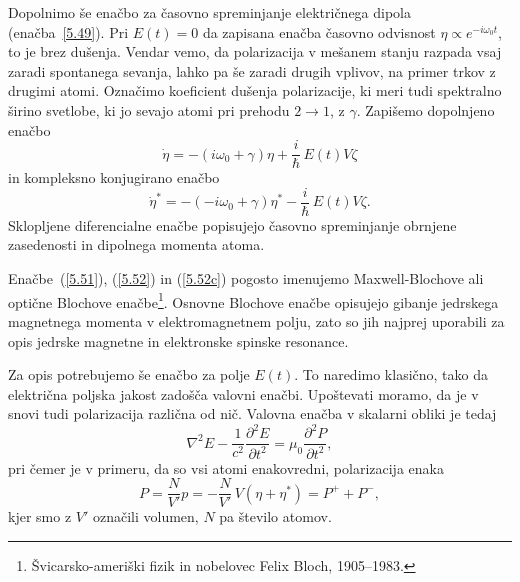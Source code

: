 Dopolnimo še enačbo za časovno spreminjanje električnega dipola 
(enačba~\ref{5.49}). Pri $E(t)=0$ da zapisana enačba časovno odvisnost 
$\eta \propto e^{-i \omega_0 t}$, to je brez dušenja. Vendar vemo, da
polarizacija v mešanem stanju razpada vsaj zaradi spontanega sevanja, lahko
pa še zaradi drugih vplivov, na primer trkov z drugimi atomi. Označimo
koeficient dušenja polarizacije, ki meri tudi spektralno širino svetlobe, 
ki jo sevajo atomi pri prehodu $2\rightarrow 1$, z $\gamma$. Zapišemo
dopolnjeno enačbo
\begin{equation}  
\label{5.52}
\dot{\eta}=- \left(i \omega_0+\gamma\right)\eta+\frac{i}{\hbar}\,E(t)V \zeta
\end{equation}
in kompleksno konjugirano enačbo
\begin{equation}  
\label{5.52c}
\dot{\eta}^*=-\left(-i \omega_0+\gamma\right)\eta^*-\frac{i}{\hbar}\,E(t)V \zeta.
\end{equation}
Sklopljene diferencialne enačbe popisujejo časovno
spreminjanje obrnjene zasedenosti in dipolnega momenta atoma. 
\begin{remark}
 Enačbe~(\ref{5.51}), (\ref{5.52}) in (\ref{5.52c}) pogosto imenujemo 
 Maxwell-Blochove ali optične Blochove enačbe\footnote{Švicarsko-ameriški fizik 
 in nobelovec Felix Bloch, 1905--1983.}. Osnovne Blochove enačbe opisujejo gibanje 
 jedrskega magnetnega  momenta v elektromagnetnem polju, zato so jih najprej uporabili za opis 
 jedrske magnetne in elektronske spinske resonance. 
\end{remark}

Za opis potrebujemo še enačbo za polje $E(t)$. To naredimo klasično, tako da
električna poljska jakost zadošča valovni enačbi. Upoštevati moramo, 
da je v snovi tudi polarizacija različna od nič. 
Valovna enačba v skalarni obliki je tedaj
\begin{equation}  
\label{5.54}
\nabla^2 E-\frac{1}{c^2}\frac{\partial^2 E}{\partial t^2}=\mu_0 \frac{\partial^2 P}{\partial t^2},
\end{equation}
pri čemer je v primeru, da so vsi atomi enakovredni, polarizacija enaka
\begin{equation}  
\label{5.53}
P=\frac{N}{V'}p = -\frac{N}{V'}\,V\left(\eta+\eta^{\ast}\right)=P^+ + P^-,
\end{equation}
kjer smo z $V'$ označili volumen, $N$ pa število atomov.

